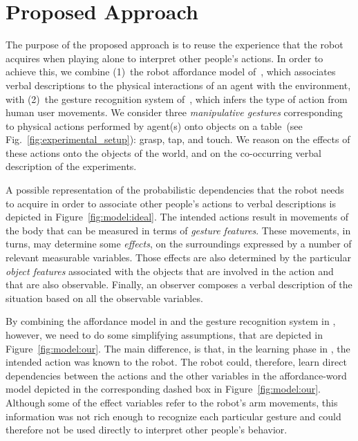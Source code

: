 \section{Proposed Approach}
The purpose of the proposed approach is to reuse the experience that the robot acquires when playing alone to interpret other people's actions.
In order to achieve this, we combine (1)~the robot affordance model of~\cite{salvi:2012:smcb}, which associates verbal descriptions to the physical interactions of an agent with the environment, with (2)~the gesture recognition system of~\cite{saponaro:2013:crhri}, which infers the type of action from human user movements.
We consider three \emph{manipulative gestures} corresponding to physical actions performed by agent(s) onto objects on a table~(see Fig.~\ref{fig:experimental_setup}): grasp, tap, and touch.
We reason on the effects of these actions onto the objects of the world, and on the co-occurring verbal description of the experiments.

A possible representation of the probabilistic dependencies that the robot needs to acquire in order to associate other people's actions to verbal descriptions is depicted in Figure~\ref{fig:model:ideal}.
The intended actions result in movements of the body that can be measured in terms of \emph{gesture features}.
These movements, in turns, may determine some \emph{effects}, on the surroundings expressed by a number of relevant measurable variables.
Those effects are also determined by the particular \emph{object features} associated with the objects that are involved in the action and that are also observable.
Finally, an observer composes a verbal description of the situation based on all the observable variables.

By combining the affordance model in \cite{salvi:2012:smcb} and the gesture recognition system in \cite{saponaro:2013:crhri}, however, we need to do some simplifying assumptions, that are depicted in Figure~\ref{fig:model:our}.
The main difference, is that, in the learning phase in \cite{salvi:2012:smcb}, the intended action was known to the robot.
The robot could, therefore, learn direct dependencies between the actions and the other variables in the affordance-word model depicted in the corresponding dashed box in Figure~\ref{fig:model:our}.
Although some of the effect variables refer to the robot's arm movements, this information was not rich enough to recognize each particular gesture and could therefore not be used directly to interpret other people's behavior.

